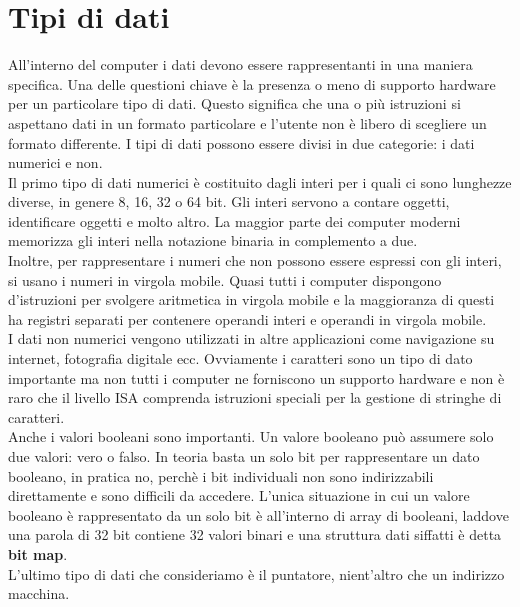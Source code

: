 \documentclass[12pt]{report}
\begin{document}
		\section{Tipi di dati}
		All'interno del computer i dati devono essere rappresentanti in una maniera specifica. Una delle questioni chiave è la presenza o meno di supporto hardware per un particolare tipo di dati. Questo significa che una o più istruzioni si aspettano dati in un formato particolare e l'utente non è libero di scegliere un formato differente.
		I tipi di dati possono essere divisi in due categorie: i dati numerici e non. \\
		Il primo tipo di dati numerici è costituito dagli interi per i quali ci sono lunghezze diverse, in genere 8, 16, 32 o 64 bit. Gli interi servono a contare oggetti, identificare oggetti e molto altro. La maggior parte dei computer moderni memorizza gli interi nella notazione binaria in complemento a due. \\
		Inoltre, per rappresentare i numeri che non possono essere espressi con gli interi, si usano i numeri in virgola mobile. Quasi tutti i computer dispongono d'istruzioni per svolgere aritmetica in virgola mobile e la maggioranza di questi ha registri separati per contenere operandi interi e operandi in virgola mobile. \\
		I dati non numerici vengono utilizzati in altre applicazioni come navigazione su internet, fotografia digitale ecc. Ovviamente i caratteri sono un tipo di dato importante ma non tutti i computer ne forniscono un supporto hardware e non è raro che il livello ISA comprenda istruzioni speciali per la gestione di stringhe di caratteri. \\
		Anche i valori booleani sono importanti. Un valore booleano può assumere solo due valori: vero o falso. In teoria basta un solo bit per rappresentare un dato booleano, in pratica no, perchè i bit individuali non sono indirizzabili direttamente e sono difficili da accedere. L'unica situazione in cui un valore booleano è rappresentato da un solo bit è all'interno di array di booleani, laddove una parola di 32 bit contiene 32 valori binari e una struttura dati siffatti è detta \textbf{bit map}. \\
		L'ultimo tipo di dati che consideriamo è il puntatore, nient'altro che un indirizzo macchina.
\end{document}
